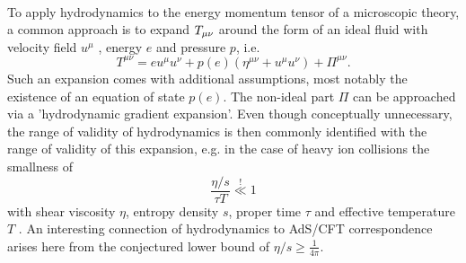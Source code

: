 \\
To apply hydrodynamics to the energy momentum tensor of a microscopic theory, a common approach is to expand $T_{\mu \nu}$ around the form of an ideal fluid with velocity field $u^\mu$ , energy $e$ and pressure $p$, i.e.
\begin{equation}
	T^{\mu \nu} = e u^\mu u^\nu + p(e) (\eta^{\mu \nu} +  u^\mu u^\nu ) + \Pi^{\mu \nu}.
\end{equation}
Such an expansion comes with additional assumptions, most notably the existence of an equation of state
$p(e)$. The non-ideal part $\Pi$ can be approached via a ’hydrodynamic gradient expansion’. Even though
conceptually unnecessary, the range of validity of hydrodynamics is then commonly identified with the
range of validity of this expansion, e.g. in the case of heavy ion collisions the smallness of
\begin{equation}
	\frac{\eta/s}{\tau T} \stackrel{!}{\ll} 1
\end{equation}
with shear viscosity $η$, entropy density $s$, proper time $\tau$ and effective temperature $T$ . An interesting
connection of hydrodynamics to AdS/CFT correspondence arises here from the conjectured lower
bound of $\eta/s\geq \frac{1}{4 \pi}$.


